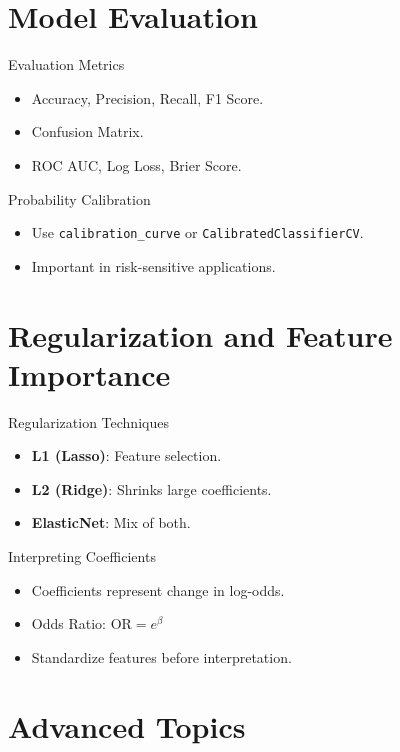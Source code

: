 \documentclass{beamer}
\begin{document}
\section{Model Evaluation}

\begin{frame}{Evaluation Metrics}
\begin{itemize}
  \item Accuracy, Precision, Recall, F1 Score.
  \item Confusion Matrix.
  \item ROC AUC, Log Loss, Brier Score.
\end{itemize}
\end{frame}

\begin{frame}{Probability Calibration}
\begin{itemize}
  \item Use \texttt{calibration\_curve} or \texttt{CalibratedClassifierCV}.
  \item Important in risk-sensitive applications.
\end{itemize}
\end{frame}

\section{Regularization and Feature Importance}

\begin{frame}{Regularization Techniques}
\begin{itemize}
  \item \textbf{L1 (Lasso)}: Feature selection.
  \item \textbf{L2 (Ridge)}: Shrinks large coefficients.
  \item \textbf{ElasticNet}: Mix of both.
\end{itemize}
\end{frame}

\begin{frame}{Interpreting Coefficients}
\begin{itemize}
  \item Coefficients represent change in log-odds.
  \item Odds Ratio: \( \text{OR} = e^{\beta} \)
  \item Standardize features before interpretation.
\end{itemize}
\end{frame}

\section{Advanced Topics}
\end{document}
